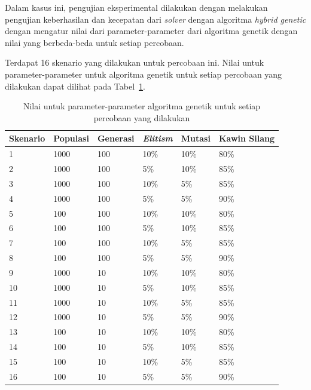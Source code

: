 Dalam kasus ini, pengujian eksperimental dilakukan dengan melakukan pengujian keberhasilan dan kecepatan dari \textit{solver} dengan algoritma \textit{hybrid genetic} dengan mengatur nilai dari parameter-parameter dari algoritma genetik dengan nilai yang berbeda-beda untuk setiap percobaan.

Terdapat 16 skenario yang dilakukan untuk percobaan ini. Nilai untuk parameter-parameter untuk algoritma genetik untuk setiap percobaan yang dilakukan dapat dilihat pada Tabel~\ref{tab:nilaiparameterhg}.

\begin{table}
\centering
\captionsetup{justification=centering}
\caption[Nilai untuk parameter-parameter algoritma genetik untuk setiap percobaan yang dilakukan]{Nilai untuk parameter-parameter algoritma genetik untuk setiap percobaan yang dilakukan}
\begin{tabular}{| l | l | l | l | l | l |}
\hline
Skenario & Populasi & Generasi & \textit{Elitism} & Mutasi & Kawin Silang  \\
\hline \hline
1 & 1000 & 100 & 10\% & 10\% & 80\% \\
\hline
2 & 1000 & 100 & 5\% & 10\% & 85\% \\
\hline
3 & 1000 & 100 & 10\% & 5\% & 85\% \\
\hline
4 & 1000 & 100  & 5\% & 5\% & 90\% \\
\hline
5 & 100 & 100 & 10\% & 10\% & 80\% \\
\hline
6 & 100 & 100 & 5\% & 10\% & 85\% \\
\hline
7 & 100 & 100 & 10\% & 5\% & 85\% \\
\hline
8 & 100 & 100 & 5\% & 5\% & 90\% \\
\hline
9 & 1000 & 10 & 10\% & 10\% & 80\% \\
\hline
10 & 1000 & 10 & 5\% & 10\% & 85\% \\
\hline
11 & 1000 & 10 & 10\% & 5\% & 85\% \\
\hline
12 & 1000 & 10  & 5\% & 5\% & 90\% \\
\hline
13 & 100 & 10 & 10\% & 10\% & 80\% \\
\hline
14 & 100 & 10 & 5\% & 10\% & 85\% \\
\hline
15 & 100 & 10 & 10\% & 5\% & 85\% \\
\hline
16 & 100 & 10 & 5\% & 5\% & 90\% \\
\hline
\end{tabular}
\label{tab:nilaiparameterhg}
\end{table}

